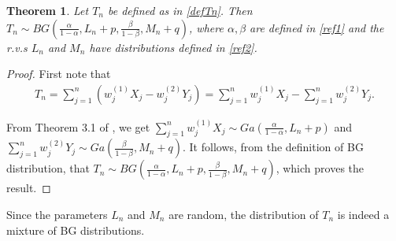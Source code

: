 \documentclass[12pt, a4paper,reqno]{amsart}
\newtheorem{thm}{Theorem}[section]
\theoremstyle{definition}
\theoremstyle{myremark}
\numberwithin{equation}{section}
\begin{document}
\begin{thm}\label{THM1}
	Let $T_n$ be defined as in \eqref{defTn}. Then $T_n\sim BG(\frac{\alpha}{1-\alpha}, L_n+p,\frac{\beta}{1-\beta},M_n+q)$, where $\alpha, \beta$ are defined in \eqref{ref1} and the r.v.s $L_n$ and $M_n$ have distributions defined in \eqref{ref2}.
\end{thm}
\begin{proof}
	First note that 
	\begin{align}\label{gdd0}
		T_n	=\sum_{j=1}^{n}(w_j^{(1)}X_j-w_j^{(2)}Y_j)=\sum_{j=1}^{n}w_j^{(1)}X_j-\sum_{j=1}^{n}w_j^{(2)}Y_j.
	\end{align}
\vspace{-0.5cm}	

	\noindent
	 From Theorem 3.1 of \cite{pvns2009}, we get $\sum_{j=1}^{n}w_j^{(1)}X_j \sim Ga(\frac{\alpha}{1-\alpha},L_n+p)$ and $\sum_{j=1}^{n}w_j^{(2)}Y_j \sim Ga(\frac{\beta}{1-\beta}, M_n+q)$. It follows, from the definition of BG distribution,  that $T_n \sim BG (\frac{\alpha}{1-\alpha},L_n+p,\frac{\beta}{1-\beta}, M_n+q)$, which proves the result. 
\end{proof}
\noindent
Since the parameters $L_n$ and $M_n$ are random, the distribution of $T_n$ is indeed a mixture of BG distributions.
\end{document}
